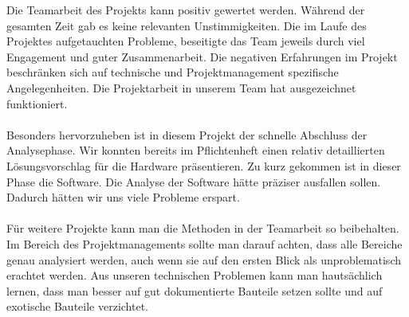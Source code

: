 Die Teamarbeit des Projekts kann positiv gewertet werden. Während der gesamten Zeit gab es keine relevanten Unstimmigkeiten. Die im Laufe des Projektes aufgetauchten Probleme, beseitigte das Team jeweils durch viel Engagement und guter Zusammenarbeit. Die negativen Erfahrungen im Projekt beschränken sich auf technische und Projektmanagement spezifische Angelegenheiten. Die Projektarbeit in unserem Team hat ausgezeichnet funktioniert.\\
\\
Besonders hervorzuheben ist in diesem Projekt der schnelle Abschluss der Analysephase. Wir konnten bereits im Pflichtenheft einen relativ detaillierten Lösungsvorschlag für die Hardware präsentieren. Zu kurz gekommen ist in dieser Phase die Software. Die Analyse der Software hätte präziser ausfallen sollen. Dadurch hätten wir uns viele Probleme erspart.\\
\\
Für weitere Projekte kann man die Methoden in der Teamarbeit so beibehalten. Im Bereich des Projektmanagements sollte man darauf achten, dass alle Bereiche genau analysiert werden, auch wenn sie auf den ersten Blick als unproblematisch erachtet werden. Aus unseren technischen Problemen kann man hautsächlich lernen, dass man besser auf gut dokumentierte Bauteile setzen sollte und auf exotische Bauteile verzichtet.